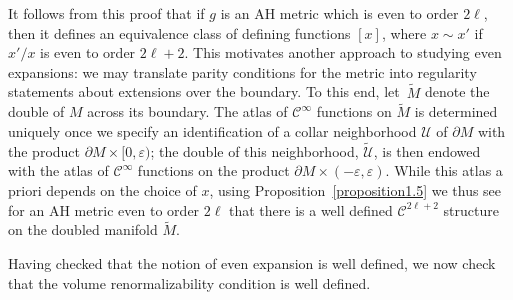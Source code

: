 \documentclass[pdftex]{sigma}
\numberwithin{equation}{section}
\renewcommand{\epsilon}{\varepsilon}
\newcommand{\wt}{\widetilde}
\newcommand{\del}{\partial}
\newcommand{\calU}{\mathcal U}
\newcommand{\calC}{\mathcal C}
\begin{document}
It follows from this proof that if $g$ is an AH metric which is even to order $2\ell$, then it defines an equivalence class of defining functions $[x]$, where $x \sim x'$ if $x'/x$ is even to order $2\ell+2$. This motivates another approach to studying even expansions: we may translate parity conditions for the metric into regularity statements about extensions over the boundary. To this end, let~$\wt{M}$ denote the double of $M$ across its boundary. The
atlas of $\calC^\infty$ functions on $\wt{M}$ is determined uniquely once we specify an identification of a collar neighborhood
$\calU$ of $\del M$ with the product $\del M \times [0,\epsilon)$; the double of this neighborhood, $\wt{\calU}$, is then
endowed with the atlas of $\calC^\infty$ functions on the product $\del M \times (-\epsilon, \epsilon)$. While this atlas a priori depends on the choice of $x$, using Proposition~\ref{proposition1.5} we thus see for an AH metric even to order $2 \ell$ that there is a well defined $\calC^{2\ell+2}$ structure on the doubled manifold $\wt{M}$.

Having checked that the notion of even expansion is well defined, we now check that the volume renormalizability condition is well defined.
\end{document}
